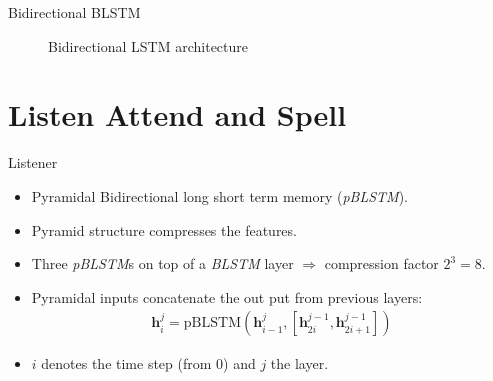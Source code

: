 \documentclass{beamer}
\begin{document}
\begin{frame}{Bidirectional BLSTM}
	\begin{figure}
		
		\caption{Bidirectional LSTM architecture}
		\label{fig:blstm}
	\end{figure}
\end{frame}


\section{Listen Attend and Spell}


\begin{frame}{Listener}
\begin{itemize}
	\item Pyramidal Bidirectional long short term memory (\textit{pBLSTM}).
	\item Pyramid structure compresses the features. 
	\item Three \textit{pBLSTM}s on top of a \textit{BLSTM} layer $\Rightarrow$ compression factor $2^3 = 8 $.
	\item Pyramidal inputs concatenate the out put from previous layers:
		  \begin{align}
		  	\mathbf{h}_i^j = \text{pBLSTM}(\mathbf{h}_{i-1}^j, [\mathbf{h}_{2i}^{j-1}, \mathbf{h}_{2i+1}^{j-1}])
		  \end{align}
	\item $i$ denotes the time step (from $0$) and $j$ the layer.
\end{itemize}
\end{frame}
\end{document}
